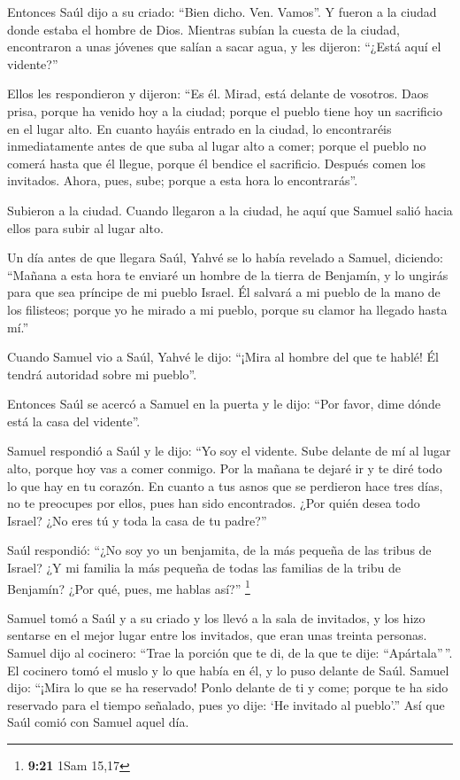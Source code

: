 \begin{paracol}{2}
 Entonces Saúl dijo a su criado: ``Bien dicho. Ven.
Vamos''. Y fueron a la ciudad donde estaba el hombre de Dios.
 Mientras subían la cuesta de la ciudad, encontraron a
unas jóvenes que salían a sacar agua, y les dijeron: ``¿Está aquí el
vidente?''

 Ellos les respondieron y dijeron: ``Es él. Mirad, está
delante de vosotros. Daos prisa, porque ha venido hoy a la ciudad;
porque el pueblo tiene hoy un sacrificio en el lugar alto.
 En cuanto hayáis entrado en la ciudad, lo encontraréis
inmediatamente antes de que suba al lugar alto a comer; porque el pueblo
no comerá hasta que él llegue, porque él bendice el sacrificio. Después
comen los invitados. Ahora, pues, sube; porque a esta hora lo
encontrarás''.

 Subieron a la ciudad. Cuando llegaron a la ciudad, he
aquí que Samuel salió hacia ellos para subir al lugar alto.

 Un día antes de que llegara Saúl, Yahvé se lo había
revelado a Samuel, diciendo:  ``Mañana a esta hora te
enviaré un hombre de la tierra de Benjamín, y lo ungirás para que sea
príncipe de mi pueblo Israel. Él salvará a mi pueblo de la mano de los
filisteos; porque yo he mirado a mi pueblo, porque su clamor ha llegado
hasta mí.''

 Cuando Samuel vio a Saúl, Yahvé le dijo: ``¡Mira al
hombre del que te hablé! Él tendrá autoridad sobre mi pueblo''.

 Entonces Saúl se acercó a Samuel en la puerta y le dijo:
``Por favor, dime dónde está la casa del vidente''.

 Samuel respondió a Saúl y le dijo: ``Yo soy el vidente.
Sube delante de mí al lugar alto, porque hoy vas a comer conmigo. Por la
mañana te dejaré ir y te diré todo lo que hay en tu corazón.
 En cuanto a tus asnos que se perdieron hace tres días,
no te preocupes por ellos, pues han sido encontrados. ¿Por quién desea
todo Israel? ¿No eres tú y toda la casa de tu padre?''

 Saúl respondió: ``¿No soy yo un benjamita, de la más
pequeña de las tribus de Israel? ¿Y mi familia la más pequeña de todas
las familias de la tribu de Benjamín? ¿Por qué, pues, me hablas así?''
\footnote{\textbf{9:21} 1Sam 15,17}

 Samuel tomó a Saúl y a su criado y los llevó a la sala
de invitados, y los hizo sentarse en el mejor lugar entre los invitados,
que eran unas treinta personas.  Samuel dijo al cocinero:
``Trae la porción que te di, de la que te dije: ``Apártala''\,''.
 El cocinero tomó el muslo y lo que había en él, y lo
puso delante de Saúl. Samuel dijo: ``¡Mira lo que se ha reservado! Ponlo
delante de ti y come; porque te ha sido reservado para el tiempo
señalado, pues yo dije: `He invitado al pueblo'.'' Así que Saúl comió
con Samuel aquel día.


\end{paracol}

